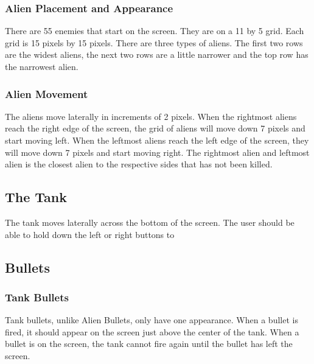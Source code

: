 \documentclass[11pt,letter,oneside]{report}
\begin{document}
\subsubsection{Alien Placement and Appearance}
There are 55 enemies that start on the screen.  They are on a 11 by 5 grid.  Each grid is 15 pixels by 15 pixels.  There are three types of aliens.  The first two rows are the widest aliens, the next two rows are a little narrower and the top row has the narrowest alien.

\subsubsection{Alien Movement}
The aliens move laterally in increments of 2 pixels.  When the rightmost aliens reach the right edge of the screen, the grid of aliens will move down 7 pixels and start moving left.  When the leftmost aliens reach the left edge of the screen, they will move down 7 pixels and start moving right.  The rightmost alien and leftmost alien is the closest alien to the respective sides that has not been killed.

\subsection{The Tank}
The tank moves laterally across the bottom of the screen.  The user should be able to hold down the left or right buttons to 

\subsection{Bullets}
\subsubsection{Tank Bullets}
Tank bullets, unlike Alien Bullets, only have one appearance.  When a bullet is fired, it should appear on the screen just above the center of the tank.  When a bullet is on the screen, the tank cannot fire again until the bullet has left the screen.
\end{document}
